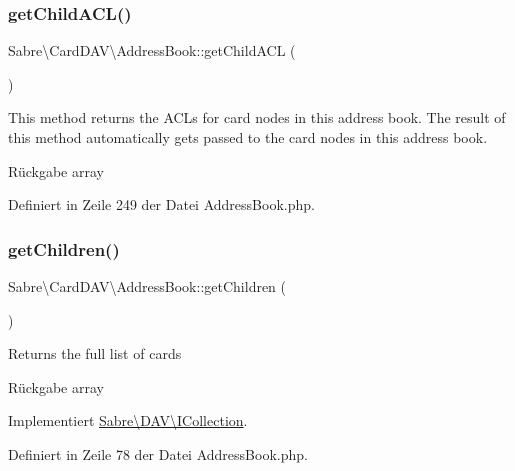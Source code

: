 \subsubsection{\texorpdfstring{get\+Child\+A\+C\+L()}{getChildACL()}}
{\footnotesize\ttfamily Sabre\textbackslash{}\+Card\+D\+A\+V\textbackslash{}\+Address\+Book\+::get\+Child\+A\+CL (\begin{DoxyParamCaption}{ }\end{DoxyParamCaption})}

This method returns the A\+CL\textquotesingle{}s for card nodes in this address book. The result of this method automatically gets passed to the card nodes in this address book.

\begin{DoxyReturn}{Rückgabe}
array 
\end{DoxyReturn}


Definiert in Zeile 249 der Datei Address\+Book.\+php.

\mbox{\label{class_sabre_1_1_card_d_a_v_1_1_address_book_a0ce5bf311d7c56481966ddf34d2b2563}} 
\subsubsection{\texorpdfstring{get\+Children()}{getChildren()}}
{\footnotesize\ttfamily Sabre\textbackslash{}\+Card\+D\+A\+V\textbackslash{}\+Address\+Book\+::get\+Children (\begin{DoxyParamCaption}{ }\end{DoxyParamCaption})}

Returns the full list of cards

\begin{DoxyReturn}{Rückgabe}
array 
\end{DoxyReturn}


Implementiert \mbox{\hyperlink{interface_sabre_1_1_d_a_v_1_1_i_collection_a5344a6890e49fd7a81bb0e38b4c6d0be}{Sabre\textbackslash{}\+D\+A\+V\textbackslash{}\+I\+Collection}}.



Definiert in Zeile 78 der Datei Address\+Book.\+php.

\mbox{\label{class_sabre_1_1_card_d_a_v_1_1_address_book_abf8ab182fe45132199d2ea8c1bbced13}} 
